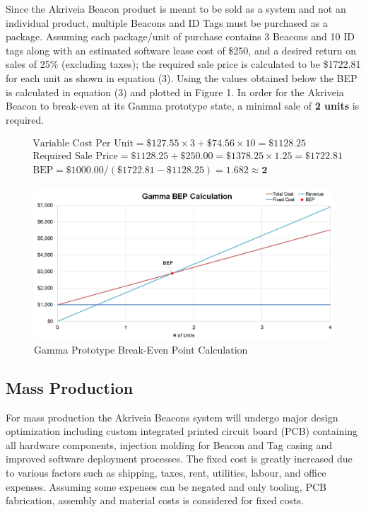 Since the Akriveia Beacon product is meant to be sold as a system and not an individual product, multiple Beacons and ID Tags must be purchased as a package. Assuming each package/unit of purchase contains 3 Beacons and 10 ID tags along with an estimated software lease cost of \$250, and a desired return on sales of 25\% (excluding taxes); the required sale price is calculated to be \$1722.81 for each unit as shown in equation (3). Using the values obtained below the BEP is calculated in equation (3) and plotted in Figure 1. In order for the Akriveia Beacon to break-even at its Gamma prototype state, a minimal sale of \textbf{2 units} is required.

\begin{align} 
	&\text{Variable Cost Per Unit} = \$127.55 \times 3 + \$74.56 \times 10 = \$1128.25	\\
	&\text{Required Sale Price} = \$1128.25 + \$250.00 = \$1378.25 \times 1.25 = \$1722.81 \\
	&\text{BEP} = \$1000.00 / (\$1722.81 - \$1128.25) = 1.682 \approx \textbf{2}	
\end{align}

\begin{figure}[H]
\centering
    \includegraphics[width=\linewidth]{./images/gamma.png}
    \caption{Gamma Prototype Break-Even Point Calculation}
\end{figure}


\pagebreak
\subsection{Mass Production}

\medskip
For mass production the Akriveia Beacons system will undergo major design optimization including custom integrated printed circuit board (PCB) containing all hardware components, injection molding for Beacon and Tag casing and improved software deployment processes. The fixed cost is greatly increased due to various factors such as shipping, taxes, rent, utilities, labour, and office expenses. Assuming some expenses can be negated and only tooling, PCB fabrication, assembly and material costs is considered for fixed costs. 


